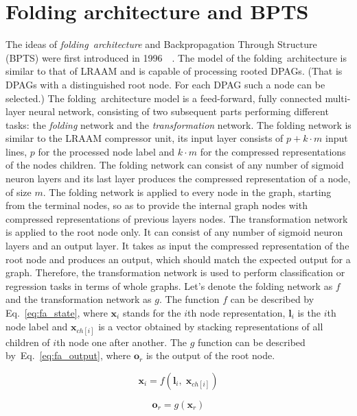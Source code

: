 \section{Folding architecture and BPTS}
The ideas of \emph{folding~architecture} and Backpropagation Through Structure (BPTS) were first introduced in 1996~\cite{goller1996learning}~\cite{kuchler1996inductive}. The model of the folding~architecture is similar to that of LRAAM and is capable of processing rooted DPAGs. (That is DPAGs with a distinguished root node. For each DPAG such a node can be selected.) The folding~architecture model is a feed-forward, fully connected multi-layer neural network, consisting of two subsequent parts performing different tasks: the \emph{folding} network and the \emph{transformation} network. The folding network is similar to the LRAAM compressor unit, its input layer consists of $p + k \cdot m$ input lines, $p$ for the processed node label and $k \cdot m$ for the compressed representations of the nodes children. The folding network can consist of any number of sigmoid neuron layers and its last layer produces the compressed representation of a node, of size $m$. The folding network is applied to every node in the graph, starting from the terminal nodes, so as to provide the internal graph nodes with compressed representations of previous layers nodes. The transformation network is applied to the root node only. It can consist of any number of sigmoid neuron layers and an output layer. It takes as input the compressed representation of the root node and produces an output, which should match the expected output for a graph. Therefore, the transformation network is used to perform classification or regression tasks in terms of whole graphs. Let's denote the folding network as $f$ and the transformation network as $g$. The function $f$ can be described by Eq.~\ref{eq:fa_state}, where $\bm{x}_i$ stands for the $i$th node representation, $\bm{l}_i$ is the $i$th node label and $\bm{x}_{ch[i]}$ is a vector obtained by stacking representations of all children of $i$th node one after another. The $g$ function can be described by~Eq.~\ref{eq:fa_output}, where $\bm{o}_r$ is the output of the root node.

\begin{equation}
\bm{x}_i = f(\bm{l}_i, \; \bm{x}_{ch[i]})
\label{eq:fa_state}
\end{equation}

\begin{equation}
\bm{o}_r = g(\bm{x}_r)
\label{eq:fa_output}
\end{equation}

